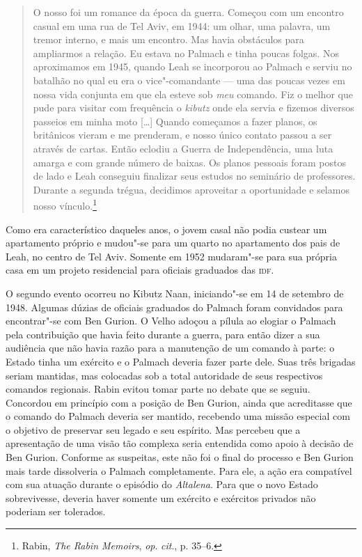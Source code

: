 \begin{quote}
O nosso foi um romance da época da guerra. Começou com um encontro
casual em uma rua de Tel Aviv, em 1944: um olhar, uma palavra, um tremor
interno, e mais um encontro. Mas havia obstáculos para ampliarmos a
relação. Eu estava no Palmach e tinha poucas folgas. Nos aproximamos em
1945, quando Leah se incorporou ao Palmach e serviu no batalhão no qual
eu era o vice"-comandante --- uma das poucas vezes em nossa vida conjunta
em que ela esteve sob \textit{meu} comando. Fiz o melhor que pude para
visitar com frequência o \textit{kibutz} onde ela servia e fizemos diversos
passeios em minha moto {[}\ldots{}{]} Quando começamos a fazer planos, os britânicos
vieram e me prenderam, e nosso único contato passou a ser através de
cartas. Então eclodiu a Guerra de Independência, uma luta amarga e com
grande número de baixas. Os planos pessoais foram postos de lado e Leah
conseguiu finalizar seus estudos no seminário de professores. Durante a
segunda trégua, decidimos aproveitar a oportunidade e selamos nosso
vínculo.\footnote{Rabin, \textit{The Rabin Memoirs}, \textit{op}. \textit{cit}., p. 35--6.}
\end{quote}

Como era característico daqueles anos, o jovem casal não podia custear
um apartamento próprio e mudou"-se para um quarto no apartamento
dos pais de Leah, no centro de Tel Aviv. Somente em 1952 mudaram"-se para
sua própria casa em um projeto residencial para oficiais graduados das
\textsc{idf}.

O segundo evento ocorreu no Kibutz Naan, iniciando"-se em 14 de setembro
de 1948. Algumas dúzias de oficiais graduados do Palmach foram
convidados para encontrar"-se com Ben Gurion. O Velho adoçou a pílula ao
elogiar o Palmach pela contribuição que havia feito durante a guerra,
para então dizer a sua audiência que não havia razão para a manutenção
de um comando à parte: o Estado tinha um exército e o Palmach deveria
fazer parte dele. Suas três brigadas seriam mantidas, mas colocadas sob
a total autoridade de seus respectivos comandos regionais. Rabin evitou
tomar parte no debate que se seguiu. Concordou em princípio com a
posição de Ben Gurion, ainda que acreditasse que o comando do Palmach
deveria ser mantido, recebendo uma missão especial com o objetivo de
preservar seu legado e seu espírito. Mas percebeu que a apresentação de
uma visão tão complexa seria entendida como apoio à decisão de Ben
Gurion. Conforme as suspeitas, este não foi o final do processo e Ben
Gurion mais tarde dissolveria o Palmach completamente. Para ele, a ação
era compatível com sua atuação durante o episódio do \textit{Altalena}.
Para que o novo Estado sobrevivesse, deveria haver somente um exército e
exércitos privados não poderiam ser tolerados.

